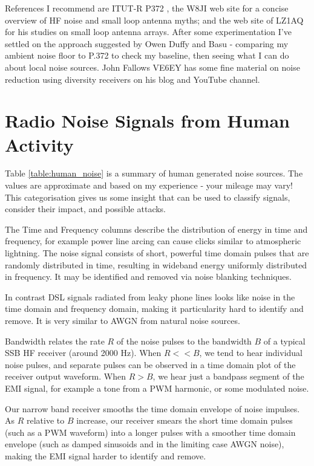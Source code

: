 \documentclass{article}
\begin{document}
References I recommend are ITUT-R P372 \cite{itu372-16}, the W8JI web site \cite{w8ji_radio_noise} for a concise overview of HF noise and small loop antenna myths; and the web site of LZ1AQ \cite{lz1aq} for his studies on small loop antenna arrays. After some experimentation \cite{rowetel_noise_city} I've settled on the approach suggested by Owen Duffy \cite{duffy_lig} and Basu \cite{vu2nsb_s_meter} - comparing my ambient noise floor to P.372 to check my baseline, then seeing what I can do about local noise sources. John Fallows VE6EY \cite{ve6ey} has some fine material on noise reduction using diversity receivers on his blog and YouTube channel.

\section{Radio Noise Signals from Human Activity}

Table \ref{table:human_noise} is a summary of human generated noise sources.  The values are approximate and based on my experience - your mileage may vary!  This categorisation gives us some insight that can be used to classify signals, consider their impact, and possible attacks.

The Time and Frequency columns describe the distribution of energy in time and frequency, for example power line arcing can cause clicks similar to atmospheric lightning.  The noise signal consists of short, powerful time domain pulses that are randomly distributed in time, resulting in wideband energy uniformly distributed in frequency. It may be identified and removed via noise blanking techniques.

In contrast DSL signals radiated from leaky phone lines looks like noise in the time domain and frequency domain, making it particularity hard to identify and remove.  It is very similar to AWGN from natural noise sources.

Bandwidth relates the rate $R$ of the noise pulses to the bandwidth $B$ of a typical SSB HF receiver (around 2000 Hz).  When $R<<B$, we tend to hear individual noise pulses, and separate pulses can be observed in a time domain plot of the receiver output waveform.  When $R>B$, we hear just a bandpass segment of the EMI signal, for example a tone from a PWM harmonic, or some modulated noise.

Our narrow band receiver smooths the time domain envelope of noise impulses. As $R$ relative to $B$ increase, our receiver smears the short time domain pulses (such as a PWM waveform) into a longer pulses with a smoother time domain envelope (such as damped sinusoids and in the limiting case AWGN noise), making the EMI signal harder to identify and remove.
\end{document}
